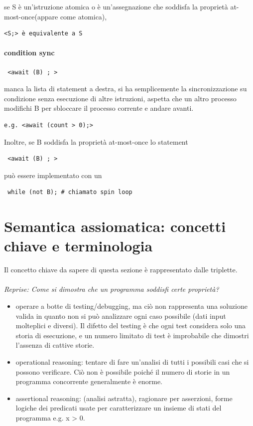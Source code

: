 \documentclass[10pt,a4paper]{article}
\begin{document}
se S è un'istruzione atomica o è un'assegnazione che soddisfa la proprietà at-most-once(appare come atomica), \begin{verbatim}<S;> è equivalente a S\end{verbatim} 

\paragraph{condition sync}
\begin{verbatim} <await (B) ; >\end{verbatim}
manca la lista di statement a destra, si ha semplicemente la sincronizzazione su condizione senza esecuzione di altre istruzioni, aspetta che un altro processo modifichi B per sbloccare il processo corrente e andare avanti.
 \begin{verbatim}e.g. <await (count > 0);>\end{verbatim}

Inoltre, se B soddisfa la proprietà at-most-once lo statement \begin{verbatim} <await (B) ; >\end{verbatim} può essere implementato con un \begin{verbatim} while (not B); # chiamato spin loop\end{verbatim}


\section{Semantica assiomatica: concetti chiave e terminologia}
Il concetto chiave da sapere di questa sezione è rappresentato dalle triplette.\\ \\
\textit{Reprise: Come si dimostra che un programma soddisfi certe proprietà?}
\begin{itemize}
\item operare a botte di testing/debugging, ma ciò non rappresenta una soluzione valida in quanto non si può analizzare ogni caso possibile (dati input molteplici e diversi). Il difetto del testing è che ogni test considera solo una storia di esecuzione, e un numero limitato di test è improbabile che dimostri l'assenza di cattive storie.
\item operational reasoning: tentare di fare un'analisi di tutti i possibili casi che si possono verificare. Ciò non è possibile poiché il numero di storie in un programma concorrente generalmente è enorme.
\item assertional reasoning: (analisi astratta), ragionare per asserzioni, forme logiche dei predicati usate per caratterizzare un insieme di stati del programma e.g. x > 0.
\end{itemize}
\end{document}
